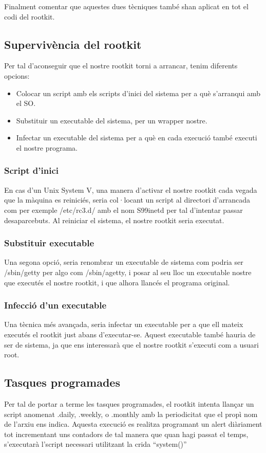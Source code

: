 Finalment comentar que aquestes dues tècniques també shan aplicat en tot el codi del rootkit.

\subsection{Supervivència del rootkit}
Per tal d'aconseguir que el nostre rootkit torni a arrancar, tenim diferents opcions:
\begin{itemize}
\item Colocar un script amb els scripts d'inici del sistema per a què s'arranqui amb el SO.
\item Substituir un executable del sistema, per un wrapper nostre.
\item Infectar un executable del sistema per a què en cada execució també executi el nostre programa.
\end{itemize}

\subsubsection{Script d'inici}
En cas d'un Unix System V, una manera d'activar el nostre rootkit cada vegada que la màquina es reiniciés, seria
col·locant un script al directori d'arrancada com per exemple /etc/rc3.d/ amb el nom S99inetd per tal
d'intentar passar desaparcebuts. Al reiniciar el sistema, el nostre rootkit seria executat.

\subsubsection{Substituir executable}
Una segona opció, seria renombrar un executable de sistema com podria ser /sbin/getty per algo com /sbin/agetty,
i posar al seu lloc un executable nostre que executés el nostre rootkit, i que alhora llancés el programa 
original. 

\subsubsection{Infecció d'un executable}
Una tècnica més avançada, seria infectar un executable per a que ell mateix executés el rootkit just abans 
d'executar-se. Aquest executable també hauria de ser de sistema, ja que ens interessarà que el nostre rootkit
s'executi com a usuari root.

\subsection{Tasques programades}
Per tal de portar a terme les tasques programades, el rootkit intenta llançar un script anomenat .daily, .weekly, o .monthly amb la periodicitat que el propì 
nom de l'arxiu ens indica. Aquesta execució es realitza programant un alert diàriament tot incrementant uns contadors de tal manera que quan hagi passat el temps, s'executarà l'script necessari utilitzant la crida ``system()'' 

